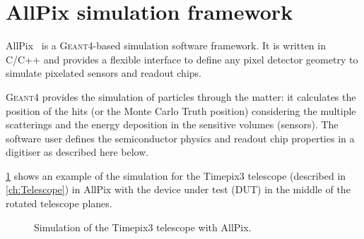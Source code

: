 \section{AllPix simulation framework}
\label{sec:AllPix}

AllPix~\cite{allpix} is a \textsc{Geant4}-based simulation software
framework. It is written in C/C++ and provides a flexible interface to
define any pixel detector geometry to simulate pixelated sensors and
readout chips.

\textsc{Geant4} provides the simulation of particles through the
matter: it calculates the position of the hits (or the Monte Carlo
Truth position) considering the multiple scatterings and the energy
deposition in the sensitive volumes (sensors). The software user
defines the semiconductor physics and readout chip properties in a
digitiser as described here below.

\cref{fig:TPX3TelescopeAllpix} shows an example of the simulation for
the Timepix3 telescope (described in \cref{ch:Telescope}) in AllPix
with the device under test (DUT) in the middle of the rotated telescope
planes.

\begin{figure}[htbp]
  \centering
  \caption{Simulation of the Timepix3 telescope with AllPix.}
  \label{fig:TPX3TelescopeAllpix}
\end{figure}

